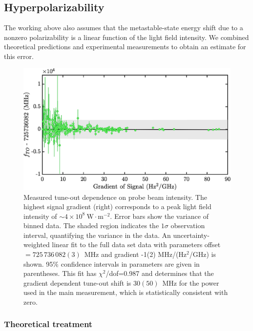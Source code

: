 \subsection{Hyperpolarizability}

	The working above also assumes that the metastable-state energy shift due to a nonzero polarizability is a linear function of the light field intensity. 
	We combined theoretical predictions and experimental measurements to obtain an estimate for this error.
	

	\begin{figure}[t]
	    \centering
	    \includegraphics[width=\textwidth]{fig/tuneout/hyperpolz_graph_full}
		\caption{Measured tune-out dependence on probe beam intensity. The highest signal gradient (right) corresponds to a peak light field intensity of \(\sim4\times10^{8}\: \mathrm{W}\cdot \mathrm{m}^{-2}\). Error bars show the variance of binned data. The shaded region indicates the \(1\sigma\) observation interval, quantifying the variance in the data.  An uncertainty-weighted linear fit to the full data set data with parameters offset\(=725\,736\,082(3)\)~MHz and gradient -1(2) MHz/(Hz\(^2\)/GHz) is shown. 95\% confidence intervals in parameters are given in parentheses. This fit has $\chi^2$/dof=0.987 and determines that the gradient dependent tune-out shift is $30(50)$~MHz for the power used in the main measurement, which is statistically consistent with zero.
		    }
	    \label{fig:hyperpolarizability}
	\end{figure}

    
\subsubsection{Theoretical treatment}

